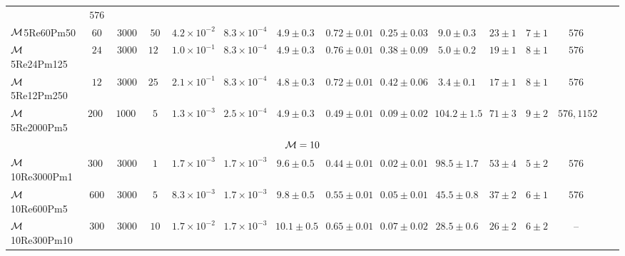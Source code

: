 \begin{table}
{{\begin{threeparttable}
\begin{tabular}{l c c c c c c c c c c c c c c}
	& $576$ \\
$\mathcal{M}$5Re60Pm50
	& $60$ & $3000$ & $50$
	& $4.2 \times 10^{-2}$ & $8.3 \times 10^{-4}$ & $4.9 \pm 0.3$
	& $0.72 \pm 0.01$ & $0.25 \pm 0.03$
	& $9.0 \pm 0.3$ & $23 \pm 1$ & $7 \pm 1$
	& $576$ \\
$\mathcal{M}$5Re24Pm125
	& $24$ & $3000$ & $125$
	& $1.0 \times 10^{-1}$ & $8.3 \times 10^{-4}$ & $4.9 \pm 0.3$
	& $0.76 \pm 0.01$ & $0.38 \pm 0.09$
	& $5.0 \pm 0.2$ & $19 \pm 1$ & $8 \pm 1$
	& $576$ \\
$\mathcal{M}$5Re12Pm250
	& $12$ & $3000$ & $250$
	& $2.1 \times 10^{-1}$ & $8.3 \times 10^{-4}$ & $4.8 \pm 0.3$
	& $0.72 \pm 0.01$ & $0.42 \pm 0.06$
	& $3.4 \pm 0.1$ & $17 \pm 1$ & $8 \pm 1$
	& $576$ \\
$\mathcal{M}$5Re2000Pm5
	& $2000$ & $10000$ & $5$
	& $1.3 \times 10^{-3}$ & $2.5 \times 10^{-4}$ & $4.9 \pm 0.3$
	& $0.49 \pm 0.01$ & $0.09 \pm 0.02$
	& $104.2 \pm 1.5$ & $71 \pm 3$ & $9 \pm 2$
	& $576, 1152$ \\
\hline
\multicolumn{13}{c}{$\mathcal{M} = 10$} \\
\hline
$\mathcal{M}$10Re3000Pm1
	& $3000$ & $3000$ & $1$
	& $1.7 \times 10^{-3}$ & $1.7 \times 10^{-3}$ & $9.6 \pm 0.5$
	& $0.44 \pm 0.01$ & $0.02 \pm 0.01$
	& $98.5 \pm 1.7$ & $53 \pm 4$ & $5 \pm 2$
	& $576$ \\
$\mathcal{M}$10Re600Pm5
	& $600$ & $3000$ & $5$
	& $8.3 \times 10^{-3}$ & $1.7 \times 10^{-3}$ & $9.8 \pm 0.5$
	& $0.55 \pm 0.01$ & $0.05 \pm 0.01$
	& $45.5 \pm 0.8$ & $37 \pm 2$ & $6 \pm 1$
	& $576$ \\
$\mathcal{M}$10Re300Pm10
	& $300$ & $3000$ & $10$
	& $1.7 \times 10^{-2}$ & $1.7 \times 10^{-3}$ & $10.1 \pm 0.5$
	& $0.65 \pm 0.01$ & $0.07 \pm 0.02$
	& $28.5 \pm 0.6$ & $26 \pm 2$ & $6 \pm 2$
	& -- \\
\hline
\hline
\end{tabular}


\end{threeparttable}}}
\end{table}
